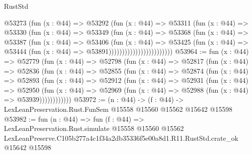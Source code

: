 \begin{lexlean}{RustStd}
\begin{coremodule}
                              @53273
                                (fun (x : @44) =>
                                @53292
                                  (fun (x : @44) =>
                                  @53311
                                    (fun (x : @44) =>
                                    @53330
                                      (fun (x : @44) =>
                                      @53349
                                        (fun (x : @44) =>
                                        @53368
                                          (fun (x : @44) =>
                                          @53387
                                            (fun (x : @44) =>
                                            @53406
                                              (fun (x : @44) =>
                                              @53425
                                                (fun (x : @44) =>
                                                @53444
                                                  (fun (x : @44) => @53891))))))))))))))))))))))))
@53964 := fun (x : @44) =>
  @52779
    (fun (x : @44) =>
    @52798
      (fun (x : @44) =>
      @52817
        (fun (x : @44) =>
        @52836
          (fun (x : @44) =>
          @52855
            (fun (x : @44) =>
            @52874
              (fun (x : @44) =>
              @52893
                (fun (x : @44) =>
                @52912
                  (fun (x : @44) =>
                  @52931
                    (fun (x : @44) =>
                    @52950
                      (fun (x : @44) =>
                      @52969 (fun (x : @44) => @52988 (fun (x : @44) => @53939))))))))))))
@53972 := (n : @44) ->
  (f : @44) -> LexLeanPreservation.Rust.FunSem @15558 @15560 @15562 @15642 @15598
@53982 := fun (n : @44) =>
  fun (f : @44) =>
  LexLeanPreservation.Rust.simulate
    @15558
    @15560
    @15562
    LexLeanPreserve.C105b277a4c1f34a2db35336f5e00a8d1.R11.RustStd.crate_ok
    @15642
    @15598
\end{coremodule}
\end{lexlean}
